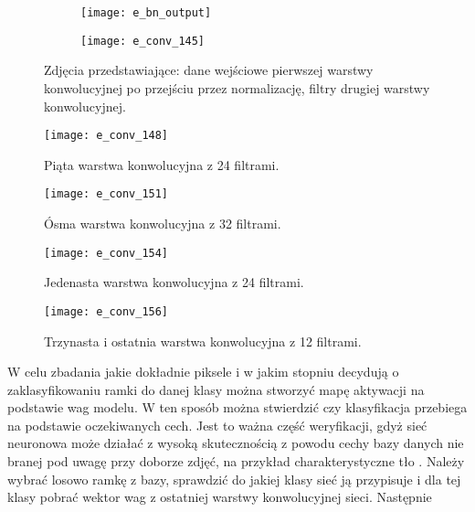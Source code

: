 \begin{figure}[h!]
    \centering
    \begin{subfigure}[b]{0.60\textwidth}
        \texttt{[image: e\_bn\_output]}\caption{}
        \label{fig:e_bn_output}
    \end{subfigure}
    \begin{subfigure}[b]{0.60\textwidth}
        \texttt{[image: e\_conv\_145]}\caption{}
        \label{fig:e_conv_145}
    \end{subfigure}
    \caption{Zdjęcia przedstawiające: \protect{} dane wejściowe pierwszej warstwy konwolucyjnej po przejściu przez normalizację, \protect{} filtry drugiej warstwy konwolucyjnej.}
	\label{fig:filters_1}
\end{figure}

\begin{figure}[h!]
	\centering
	\centering
		\texttt{[image: e\_conv\_148]}	
	\caption{Piąta warstwa konwolucyjna z 24 filtrami.}\label{fig:e_conv_148}
\end{figure}

\begin{figure}[h!]
	\centering
	\centering
		\texttt{[image: e\_conv\_151]}	
	\caption{Ósma warstwa konwolucyjna z 32 filtrami.}\label{fig:e_conv_151}
\end{figure}

\begin{figure}[h!]
	\centering
	\centering
		\texttt{[image: e\_conv\_154]}	
	\caption{Jedenasta warstwa konwolucyjna z 24 filtrami.}\label{fig:e_conv_154}
\end{figure}

\begin{figure}[h!]
	\centering
	\centering
		\texttt{[image: e\_conv\_156]}	
	\caption{Trzynasta i ostatnia warstwa konwolucyjna z 12 filtrami.}\label{fig:e_conv_156}
\end{figure}

W celu zbadania jakie dokładnie piksele i w jakim stopniu decydują o zaklasyfikowaniu ramki do danej klasy można stworzyć mapę aktywacji na podstawie wag modelu. W ten sposób można stwierdzić czy klasyfikacja przebiega na podstawie oczekiwanych cech. Jest to ważna część weryfikacji, gdyż sieć neuronowa może działać z wysoką skutecznością z powodu cechy bazy danych nie branej pod uwagę przy doborze zdjęć, na przykład charakterystyczne tło \cite{Mller2012IntroductionPA}. Należy wybrać losowo ramkę z bazy, sprawdzić do jakiej klasy sieć ją przypisuje i dla tej klasy pobrać wektor wag z ostatniej warstwy konwolucyjnej sieci. Następnie 
